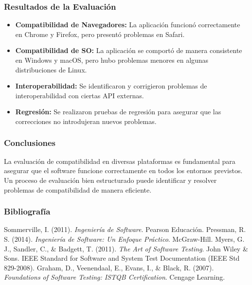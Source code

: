 \documentclass{beamer}
\begin{document}
\begin{frame}
\frametitle{Resultados de la Evaluación}
\begin{itemize}
    \item \textbf{Compatibilidad de Navegadores:} La aplicación funcionó correctamente en Chrome y Firefox, pero presentó problemas en Safari.
    \item \textbf{Compatibilidad de SO:} La aplicación se comportó de manera consistente en Windows y macOS, pero hubo problemas menores en algunas distribuciones de Linux.
    \item \textbf{Interoperabilidad:} Se identificaron y corrigieron problemas de interoperabilidad con ciertas API externas.
    \item \textbf{Regresión:} Se realizaron pruebas de regresión para asegurar que las correcciones no introdujeran nuevos problemas.
\end{itemize}
\end{frame}

\begin{frame}
\frametitle{Conclusiones}
La evaluación de compatibilidad en diversas plataformas es fundamental para asegurar que el software funcione correctamente en todos los entornos previstos. Un proceso de evaluación bien estructurado puede identificar y resolver problemas de compatibilidad de manera eficiente.
\end{frame}

\begin{frame}
\frametitle{Bibliografía}
\begin{thebibliography}{9}
     Sommerville, I. (2011). \textit{Ingeniería de Software}. Pearson Educación.
     Pressman, R. S. (2014). \textit{Ingeniería de Software: Un Enfoque Práctico}. McGraw-Hill.
     Myers, G. J., Sandler, C., \& Badgett, T. (2011). \textit{The Art of Software Testing}. John Wiley \& Sons.
     IEEE Standard for Software and System Test Documentation (IEEE Std 829-2008).
     Graham, D., Veenendaal, E., Evans, I., \& Black, R. (2007). \textit{Foundations of Software Testing: ISTQB Certification}. Cengage Learning.
\end{thebibliography}
\end{frame}
\end{document}
